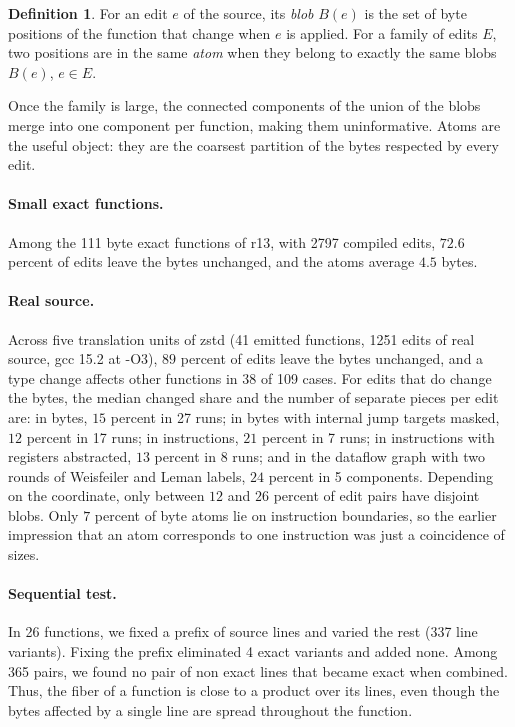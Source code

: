 \documentclass[11pt]{article}
\theoremstyle{definition}
\newtheorem{definition}[theorem]{Definition}
\theoremstyle{remark}
\begin{document}
\begin{definition}
For an edit $e$ of the source, its \emph{blob} $B(e)$ is the set of byte positions of the function that change when $e$ is applied. For a family of edits $E$, two positions are in the same \emph{atom} when they belong to exactly the same blobs $B(e)$, $e \in E$.
\end{definition}

Once the family is large, the connected components of the union of the blobs merge into one component per function, making them uninformative. Atoms are the useful object: they are the coarsest partition of the bytes respected by every edit.

\paragraph{Small exact functions.} Among the 111 byte exact functions of r13, with 2797 compiled edits, $72.6$ percent of edits leave the bytes unchanged, and the atoms average $4.5$ bytes.

\paragraph{Real source.} Across five translation units of zstd (41 emitted functions, 1251 edits of real source, gcc 15.2 at -O3), $89$ percent of edits leave the bytes unchanged, and a type change affects other functions in 38 of 109 cases. For edits that do change the bytes, the median changed share and the number of separate pieces per edit are: in bytes, $15$ percent in 27 runs; in bytes with internal jump targets masked, $12$ percent in 17 runs; in instructions, $21$ percent in 7 runs; in instructions with registers abstracted, $13$ percent in 8 runs; and in the dataflow graph with two rounds of Weisfeiler and Leman labels, $24$ percent in 5 components. Depending on the coordinate, only between $12$ and $26$ percent of edit pairs have disjoint blobs. Only $7$ percent of byte atoms lie on instruction boundaries, so the earlier impression that an atom corresponds to one instruction was just a coincidence of sizes.

\paragraph{Sequential test.} In 26 functions, we fixed a prefix of source lines and varied the rest (337 line variants). Fixing the prefix eliminated 4 exact variants and added none. Among 365 pairs, we found no pair of non exact lines that became exact when combined. Thus, the fiber of a function is close to a product over its lines, even though the bytes affected by a single line are spread throughout the function.
\end{document}
